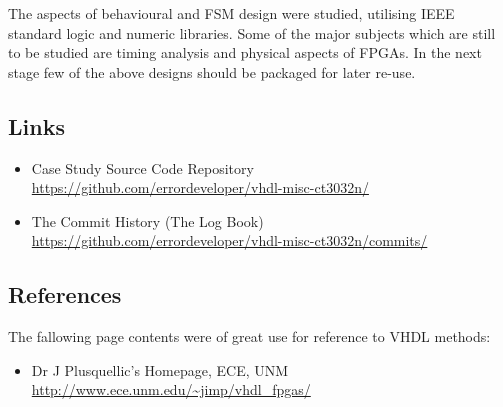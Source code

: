 \documentclass[10pt,a4paper]{report}
\begin{document}
 The aspects of behavioural and FSM design were
 studied, utilising IEEE standard logic and
 numeric libraries. Some of the major subjects
 which are still to be studied are timing
 analysis and physical aspects of FPGAs.
 In the next stage few of the above designs
 should be packaged for later re-use.

\subsection*{Links}
 \begin{itemize}
 \item Case Study Source Code Repository \\
 \url{https://github.com/errordeveloper/vhdl-misc-ct3032n/}
 \item The Commit History (The Log Book) \\
 \url{https://github.com/errordeveloper/vhdl-misc-ct3032n/commits/}
 \end{itemize}

\subsection*{References}
 The fallowing page contents were of great use
 for reference to VHDL methods:

 \begin{itemize}
 \item Dr J Plusquellic's Homepage, ECE, UNM \\
 \url{http://www.ece.unm.edu/~jimp/vhdl_fpgas/}
 \end{itemize}
\end{document}
